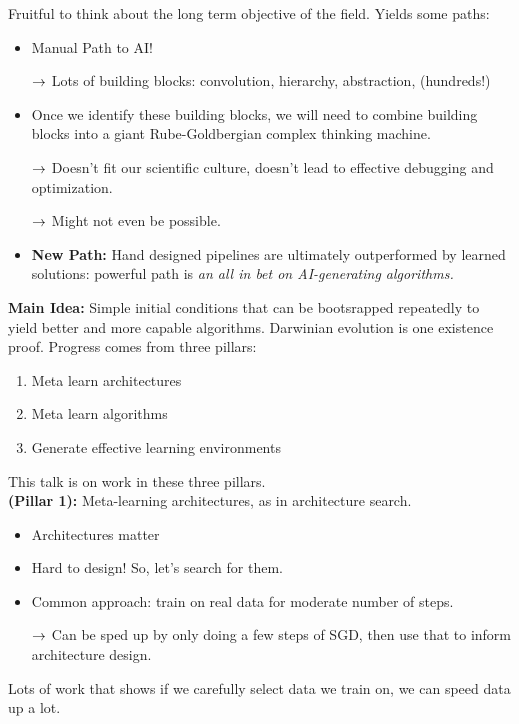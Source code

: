 Fruitful to think about the long term objective of the field. Yields some paths:
\begin{itemize}
    \item Manual Path to AI!
    
    $\rightarrow$ Lots of building blocks: convolution, hierarchy, abstraction, (hundreds!)
    
    \item Once we identify these building blocks, we will need to combine building blocks into a giant Rube-Goldbergian complex thinking machine.
    
    $\rightarrow$ Doesn't fit our scientific culture, doesn't lead to effective debugging and optimization.
    
    $\rightarrow$ Might not even be possible.
    
    \item {\bf New Path:} Hand designed pipelines are ultimately outperformed by learned solutions: powerful path is {\it an all in bet on AI-generating algorithms.}
\end{itemize}

{\bf Main Idea:} Simple initial conditions that can be bootsrapped repeatedly to yield better and more capable algorithms. Darwinian evolution is one existence proof. Progress comes from three pillars:
\begin{enumerate}
    \item Meta learn architectures
    \item Meta learn algorithms
    \item Generate effective learning environments
\end{enumerate}

This talk is on work in these three pillars. \\

{\bf (Pillar 1):} Meta-learning architectures, as in architecture search.
\begin{itemize}
    \item Architectures matter
    \item Hard to design! So, let's search for them.
    \item Common approach: train on real data for moderate number of steps.
    
    $\rightarrow$ Can be sped up by only doing a few steps of SGD, then use that to inform architecture design.
\end{itemize}

Lots of work that shows if we carefully select data we train on, we can speed data up a lot. \\

